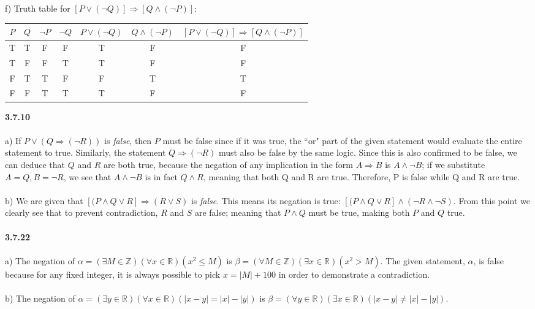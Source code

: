 \documentclass[12pt]{article}
\begin{document}
f)
Truth table for $[P \lor (\neg Q)] \Rightarrow [Q \land (\neg P)]$:\\
\begin{center}
\begin{tabular}{|c|c|c|c|c|c|c|}
\hline
$P$ & $Q$ & $\neg P$ & $\neg Q$ & $P \lor (\neg Q)$ & $Q \land (\neg P)$ & $[P \lor (\neg Q)] \Rightarrow [Q \land (\neg P)]$\\
\hline
T & T & F & F & T & F & F\\
T & F & F & T & T & F & F\\
F & T & T & F & F & T & T\\
F & F & T & T & T & F & F\\
\hline
\end{tabular}
\end{center}

\textbf{3.7.10}\\\\
a)
If $P \lor (Q \Rightarrow (\neg R))$ is \emph{false}, then $P$ must be false since if it was true, the ``or" part of the given statement would evaluate the entire statement to true. 
Similarly, the statement $Q \Rightarrow (\neg R)$ must also be false by the same logic. Since this is also confirmed to be false, we can deduce that $Q$ and $R$ are both true, because
the negation of any implication in the form $A \Rightarrow B$ is $A \land \neg B$; if we substitute $A = Q, B = \neg R$, we see that $A \land \neg B$ is in fact $Q \land R$, meaning 
that both Q and R are true. Therefore, P is false while Q and R are true.\\\\
b)
We are given that $[(P \land Q \lor R] \Rightarrow (R \lor S)$ is \emph{false}. This means its negation is true: $[(P \land Q \lor R] \land (\neg R \land \neg S)$. 
From this point we clearly see that to prevent contradiction, $R$ and $S$ are false; meaning that $P \land Q$ must be true, making both $P$ and $Q$ true.\\\\
\textbf{3.7.22}\\\\
a)
The negation of $\alpha = (\exists M \in \mathbb{Z})(\forall x \in \mathbb{R})(x^2 \leq M)$ is $\beta = (\forall M \in \mathbb{Z})(\exists x \in \mathbb{R})(x^2 > M)$. 
The given statement, $\alpha$, is false because for any fixed integer, it is always possible to pick $x = |M| + 100$ in order to demonstrate a contradiction.\\\\
b)
The negation of $\alpha = (\exists y \in \mathbb{R})(\forall x \in \mathbb{R})(|x-y|=|x|-|y|)$ is $\beta = (\forall y \in \mathbb{R})(\exists x \in \mathbb{R})(|x-y| \neq |x|-|y|)$. 
\end{document}
